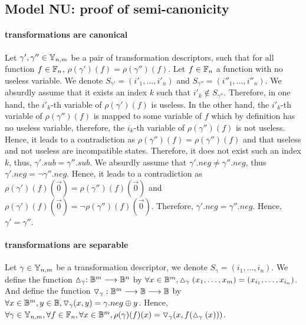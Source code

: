 \documentclass[a4paper,10pt]{article}
\begin{document}
\subsection{Model NU: proof of semi-canonicity\label{grobdd-model-nu}}

\paragraph{transformations are canonical\\}
Let $\gamma', \gamma''\in\mathbb{Y}_{n, m}$ be a pair of transformation descriptors, such that for all function $f\in\mathbb{F}_n$, $\rho(\gamma')(f) = \rho(\gamma'')(f)$.
Let $f\in\mathbb{F}_n$ a function with no useless variable.
We denote $S_{\gamma'} = (i'_1, \dots, i'_n)$ and $S_{\gamma''} = (i''_1, \dots, i''_n)$.
We absurdly assume that it exists an index $k$ such that $i'_k \not\in S_{\gamma''}$.
Therefore, in one hand, the $i'_k$-th variable of $\rho(\gamma')(f)$ is useless.
In the other hand, the $i'_k$-th variable of $\rho(\gamma'')(f)$ is mapped to some variable of $f$ which by definition has no useless variable, therefore, the $i_k$-th variable of $\rho(\gamma'')(f)$ is not useless.
Hence, it leads to a contradiction as $\rho(\gamma'')(f) = \rho(\gamma'')(f)$ and that useless and not useless are incompatible states.
Therefore, it does not exist such an index $k$, thus, $\gamma'.sub = \gamma''.sub$.
We absurdly assume that $\gamma'.neg \neq \gamma''.neg$, thus $\gamma'.neg = \lnot \gamma''.neg$.
Hence, it leads to a contradiction as $\rho(\gamma')(f)(\vec{0}) = \rho(\gamma'')(f)(\vec{0})$ and $\rho(\gamma')(f)(\vec{0}) = \lnot \rho(\gamma'')(f)(\vec{0})$.
Therefore, $\gamma'.neg = \gamma''.neg$.
Hence, $\gamma' = \gamma''$.

\paragraph{transformations are separable\\}
Let $\gamma\in\mathbb{Y}_{n, m}$ be a transformation descriptor, we denote $S_{\gamma} = (i_1, \dots, i_n)$.
We define the function $\vartriangle_\gamma : \mathbb{B}^m \longrightarrow \mathbb{B}^n$ by $\forall x\in\mathbb{B}^m, \vartriangle_\gamma(x_1, \dots, x_m) = (x_{i_1}, \dots, x_{i_n})$.
And define the function $\triangledown_\gamma : \mathbb{B}^m \longrightarrow \mathbb{B} \longrightarrow \mathbb{B}$ by $\forall x\in\mathbb{B}^m, y\in\mathbb{B}, \triangledown_\gamma(x, y) = \gamma.neg \oplus y$.
Hence, $\forall \gamma\in\mathbb{Y}_{n, m},\forall f\in\mathbb{F}_n, \forall x\in\mathbb{B}^m, \rho(\gamma)(f)(x) = \triangledown_\gamma(x, f(\vartriangle_\gamma(x)))$.
\end{document}
